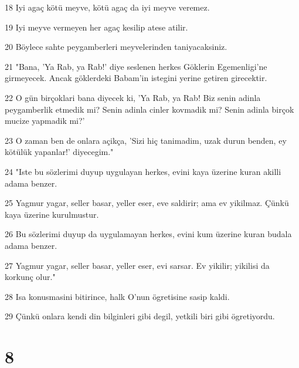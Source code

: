 \par 18 Iyi agaç kötü meyve, kötü agaç da iyi meyve veremez.
\par 19 Iyi meyve vermeyen her agaç kesilip atese atilir.
\par 20 Böylece sahte peygamberleri meyvelerinden taniyacaksiniz.
\par 21 "Bana, 'Ya Rab, ya Rab!' diye seslenen herkes Göklerin Egemenligi'ne girmeyecek. Ancak göklerdeki Babam'in istegini yerine getiren girecektir.
\par 22 O gün birçoklari bana diyecek ki, 'Ya Rab, ya Rab! Biz senin adinla peygamberlik etmedik mi? Senin adinla cinler kovmadik mi? Senin adinla birçok mucize yapmadik mi?'
\par 23 O zaman ben de onlara açikça, 'Sizi hiç tanimadim, uzak durun benden, ey kötülük yapanlar!' diyecegim."
\par 24 "Iste bu sözlerimi duyup uygulayan herkes, evini kaya üzerine kuran akilli adama benzer.
\par 25 Yagmur yagar, seller basar, yeller eser, eve saldirir; ama ev yikilmaz. Çünkü kaya üzerine kurulmustur.
\par 26 Bu sözlerimi duyup da uygulamayan herkes, evini kum üzerine kuran budala adama benzer.
\par 27 Yagmur yagar, seller basar, yeller eser, evi sarsar. Ev yikilir; yikilisi da korkunç olur."
\par 28 Isa konusmasini bitirince, halk O'nun ögretisine sasip kaldi.
\par 29 Çünkü onlara kendi din bilginleri gibi degil, yetkili biri gibi ögretiyordu.

\chapter{8}


